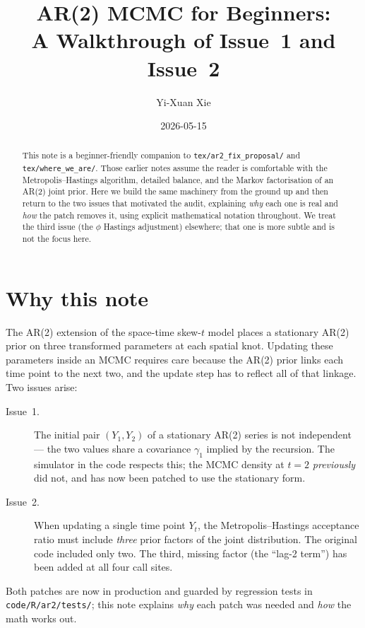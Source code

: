 \documentclass[11pt]{article}
\title{AR(2) MCMC for Beginners:\\
       A Walkthrough of Issue~1 and Issue~2}
\author{Yi-Xuan Xie}
\date{2026-05-15}
\newcommand{\skewt}{skew-$t$\xspace}
\theoremstyle{plain}
\theoremstyle{definition}
\theoremstyle{remark}
\begin{document}
\maketitle

\begin{abstract}
This note is a beginner-friendly companion to
\texttt{tex/ar2\_fix\_proposal/} and \texttt{tex/where\_we\_are/}.
Those earlier notes assume the reader is comfortable with the Metropolis--Hastings
algorithm, detailed balance, and the Markov factorisation of an AR(2) joint
prior. Here we build the same machinery from the ground up and then return
to the two issues that motivated the audit, explaining \emph{why} each one
is real and \emph{how} the patch removes it, using explicit mathematical
notation throughout. We treat the third issue (the $\phi$ Hastings
adjustment) elsewhere; that one is more subtle and is not the focus here.
\end{abstract}

\tableofcontents

\section{Why this note}\label{sec:why}

The AR(2) extension of the \citet{morris_space-time_2017} space-time \skewt
model places a stationary AR(2) prior on three transformed parameters at
each spatial knot. Updating these parameters inside an MCMC requires care
because the AR(2) prior links each time point to the next two, and the
update step has to reflect all of that linkage. Two issues arise:

\begin{description}
  \item[Issue~1.] The initial pair $(Y_1, Y_2)$ of a stationary AR(2)
        series is not independent --- the two values share a covariance
        $\gamma_1$ implied by the recursion. The simulator in the code
        respects this; the MCMC density at $t = 2$ \emph{previously} did
        not, and has now been patched to use the stationary form.
  \item[Issue~2.] When updating a single time point $Y_t$, the Metropolis--Hastings
        acceptance ratio must include \emph{three} prior factors of the
        joint distribution. The original code included only two. The third,
        missing factor (the ``lag-2 term'') has been added at all four
        call sites.
\end{description}
Both patches are now in production and guarded by regression tests in
\texttt{code/R/ar2/tests/}; this note explains \emph{why} each patch was
needed and \emph{how} the math works out.
\end{document}
